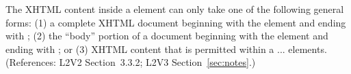 The XHTML content inside a  element can only take one of the
following general forms: (1) a complete XHTML document beginning with the
element  and ending with ; (2) the ``body''
portion of a document beginning with the element  and ending
with ; or (3) XHTML content that is permitted within a
 ...  elements.  (References: L2V2
Section~3.3.2; L2V3 Section~\ref{sec:notes}.)
